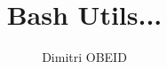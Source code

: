 \documentclass[a4paper,10pt]{article}
\title{\color{red}Bash Utils...}\color{text}
\author{Dimitri OBEID}
\begin{document}
    \maketitle
    \newpage

    \hypertarget{contents}{}
    \tableofcontents
    \newpage

    \color{sec1}
    \section{}\color{text}




\end{document}
